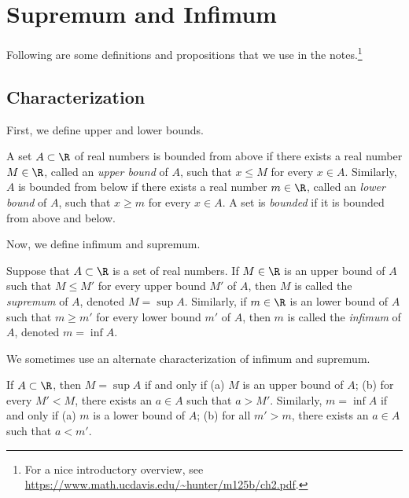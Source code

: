 \documentclass{article} %
\begin{document}
\newpage 
\appendix

\section{Supremum and Infimum}

Following are some definitions and propositions that we use in the notes.\footnote{For a nice introductory overview, see \url{https://www.math.ucdavis.edu/~hunter/m125b/ch2.pdf}.}

\subsection{Characterization}

First, we define upper and lower bounds.
\begin{definition}
A set $A \subset \R$ of real numbers is bounded from above if there exists a real number $M \in \R$, called an \textit{upper bound} of $A$, such that $x \leq M$ for every $x \in A$.  Similarly, $A$  is bounded from below if there exists a real number $m \in \R$, called an \textit{lower bound} of $A$, such that $x \geq m$ for every $x \in A$.  A set is \textit{bounded} if it is bounded from above and below.
\label{def:upper_and_lower_bound}	
\end{definition}


Now, we define infimum and supremum.
\begin{definition}
Suppose that $A \subset \R$ is a set of real numbers. If $M \in \R$ is an upper bound of $A$ such that $M \leq M'$ for every upper bound $M'$ of $A$, then $M$ is called the \textit{supremum} of $A$, denoted $M=\sup A$.   Similarly, if $m \in \R$ is an lower bound of $A$ such that $m \geq m'$ for every lower bound $m'$ of $A$, then $m$ is called the \textit{infimum} of $A$, denoted $m=\inf A$.\label{def:supremum_and_infimum}	
\end{definition}

We sometimes use an alternate characterization of infimum and supremum.

\begin{proposition}

If $A \subset \R$, then $M = \sup A$ if and only if (a) $M$ is an upper bound of $A$; (b) for every $M' < M$, there exists an $a \in A$ such that $a>M'$.  Similarly, $m = \inf A$ if and only if (a) $m$ is a lower bound of $A$; (b) for all $m'>m$, there exists an $a \in A$ such that $a<m'$.
\label{prop:supremum_and_infimum_alternate_characterization}
\end{proposition}
\end{document}
